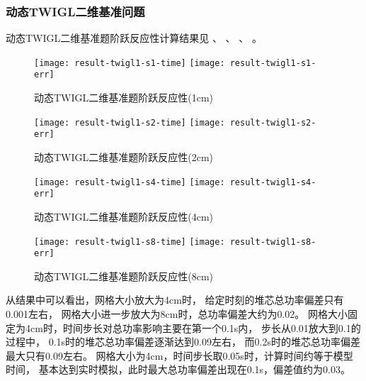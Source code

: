 \subsubsection{动态TWIGL二维基准问题}

动态TWIGL二维基准题阶跃反应性计算结果见
、
、
、
。

\begin{figure}[H]
\centering
{
\texttt{[image: result-twigl1-s1-time]}
}
{
\texttt{[image: result-twigl1-s1-err]}
}
\caption{动态TWIGL二维基准题阶跃反应性(1cm)\label{fig:testresult.twigl.1.1}}
\end{figure}

\begin{figure}[H]
\centering
{
\texttt{[image: result-twigl1-s2-time]}
}
{
\texttt{[image: result-twigl1-s2-err]}
}
\caption{动态TWIGL二维基准题阶跃反应性(2cm)\label{fig:testresult.twigl.1.2}}
\end{figure}

\begin{figure}[H]
\centering
{
\texttt{[image: result-twigl1-s4-time]}
}
{
\texttt{[image: result-twigl1-s4-err]}
}
\caption{动态TWIGL二维基准题阶跃反应性(4cm)\label{fig:testresult.twigl.1.4}}
\end{figure}

\begin{figure}[H]
\centering
{
\texttt{[image: result-twigl1-s8-time]}
}
{
\texttt{[image: result-twigl1-s8-err]}
}
\caption{动态TWIGL二维基准题阶跃反应性(8cm)\label{fig:testresult.twigl.1.8}}
\end{figure}

从结果中可以看出，网格大小放大为4cm时，
给定时刻的堆芯总功率偏差只有0.001左右，
网格大小进一步放大为8cm时，总功率偏差大约为0.02。
网格大小固定为4cm时，时间步长对总功率影响主要在第一个0.1s内，
步长从0.01放大到0.1的过程中，
0.1s时的堆芯总功率偏差逐渐达到0.09左右，
而0.2s时的堆芯总功率偏差最大只有0.09左右。
网格大小为4cm，时间步长取0.05s时，计算时间约等于模型时间，
基本达到实时模拟，此时最大总功率偏差出现在0.1s，偏差值约为0.03。

